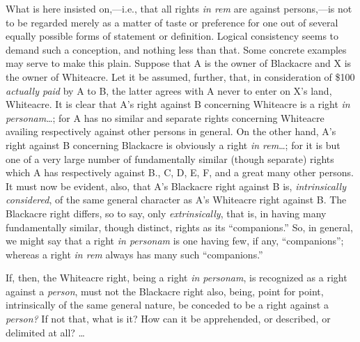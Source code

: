 What is here insisted on,---i.e., that all rights \textit{in rem} are against
persons,---is not to be regarded merely as a matter of taste or preference for
one out of several equally possible forms of statement or definition. Logical
consistency seems to demand such a conception, and nothing less than that. Some
concrete examples may serve to make this plain. Suppose that A is the owner of
Blackacre and X is the owner of Whiteacre. Let it be assumed, further, that, in
consideration of \$100 \textit{actually paid} by A to B, the latter agrees with
A never to enter on X's land, Whiteacre. It is clear that A's right against B
concerning Whiteacre is a right \textit{in personam}\ldots; for A has no
similar and separate rights concerning Whiteacre availing respectively against
other persons in general. On the other hand, A's right against B concerning
Blackacre is obviously a right \textit{in rem}\ldots; for it is but one of a
very large number of fundamentally similar (though separate) rights which A has
respectively against B., C, D, E, F, and a great many other persons. It must
now be evident, also, that A's Blackacre right against B is,
\textit{intrinsically considered}, of the same general character as A's
Whiteacre right against B. The Blackacre right differs, so to say, only
\textit{extrinsically}, that is, in having many fundamentally similar, though
distinct, rights as its ``companions.'' So, in general, we might say that a
right \textit{in personam} is one having few, if any, ``companions''; whereas a
right \textit{in rem} always has many such ``companions.'' 

If, then, the Whiteacre right, being a right \textit{in personam}, is recognized
as a right against a \textit{person}, must not the Blackacre right also, being,
point for point, intrinsically of the same general nature, be conceded to be a
right against a \textit{person?} If not that, what is it? How can it be
apprehended, or described, or delimited at all? \ldots

